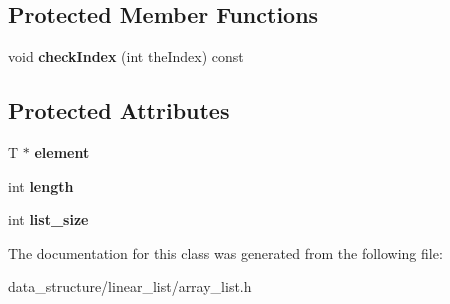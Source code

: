 \subsection*{Protected Member Functions}
\begin{DoxyCompactItemize}
\item 
\mbox{\label{classArrayList_a021f10fc94b16d6c6aea82ea11c0be5c}} 
void {\bfseries check\+Index} (int the\+Index) const
\end{DoxyCompactItemize}
\subsection*{Protected Attributes}
\begin{DoxyCompactItemize}
\item 
\mbox{\label{classArrayList_a8770fb8b423372b9747b52058eeb4a1d}} 
T $\ast$ {\bfseries element}
\item 
\mbox{\label{classArrayList_a619f07a2d43b7eb8443aab9cb268be11}} 
int {\bfseries length}
\item 
\mbox{\label{classArrayList_a9c205a059f9bdb42fe12cf9f63671a7c}} 
int {\bfseries list\+\_\+size}
\end{DoxyCompactItemize}


The documentation for this class was generated from the following file\+:\begin{DoxyCompactItemize}
\item 
data\+\_\+structure/linear\+\_\+list/array\+\_\+list.\+h\end{DoxyCompactItemize}
